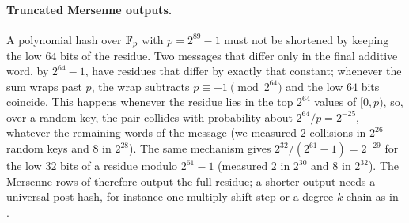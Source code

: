 \paragraph{Truncated Mersenne outputs.}
A polynomial hash over $\mathbb{F}_p$ with $p=2^{89}-1$ must not be shortened by
keeping the low $64$ bits of the residue.  Two messages that differ only in
the final additive word, by $2^{64}-1$, have residues that differ by exactly
that constant; whenever the sum wraps past $p$, the wrap subtracts
$p\equiv-1\pmod{2^{64}}$ and the low $64$ bits coincide.  This happens
whenever the residue lies in the top $2^{64}$ values of $[0,p)$, so, over a
random key, the pair collides with probability about $2^{64}/p=2^{-25}$,
whatever the remaining words of the message (we measured $2$ collisions in
$2^{26}$ random keys and $8$ in $2^{28}$).  The same mechanism gives
$2^{32}/(2^{61}-1)=2^{-29}$ for the low $32$ bits of a residue modulo
$2^{61}-1$ (measured $2$ in $2^{30}$ and $8$ in $2^{32}$).  The Mersenne rows of
 therefore output the full residue; a
shorter output needs a universal post-hash, for instance one multiply-shift
step or a degree-$k$ chain as in .
